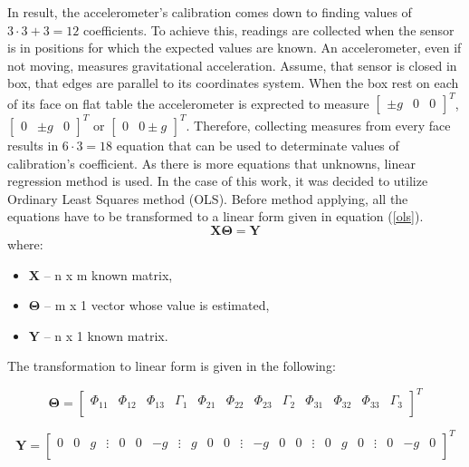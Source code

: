 In result, the accelerometer's calibration comes down to finding values of $3 \cdot 3 + 3 = 12$ coefficients. To achieve this, readings are collected when the sensor is in positions for which the expected values are known. An accelerometer, even if not moving, measures gravitational acceleration. Assume, that sensor is closed in box, that edges are parallel to its coordinates system. When the box rest on each of its face on flat table the accelerometer is exprected to measure $\begin{bmatrix}\pm g & 0 & 0\end{bmatrix}^T$, $\begin{bmatrix}0 & \pm g & 0\end{bmatrix}^T$ or $\begin{bmatrix} 0 & 0 \pm g\end{bmatrix}^T$. Therefore, collecting measures from every face results in $6 \cdot 3 = 18$ equation that can be used to determinate values of calibration's coefficient. As there is more equations that unknowns, linear regression method is used. In the case of this work, it was decided to utilize Ordinary Least Squares method (OLS). Before method applying, all the equations have to be transformed to a linear form given in equation (\ref{ols}).
\begin{equation}
	\bm{X} \bm{\Theta} = \bm{Y}
	\label{ols}
\end{equation}
where:
\begin{itemize}
	\item $\bm{X}$ -- n x m known matrix,
	\item $\bm{\Theta}$ -- m x 1 vector whose value is estimated,
	\item $\bm{Y}$ -- n x 1 known matrix.
\end{itemize}
 
The transformation to linear form is given in the following:
\setcounter{MaxMatrixCols}{25}

\begin{equation}
	\bm{\Theta} = \begin{bmatrix} \Phi_{11} & \Phi_{12} & \Phi_{13} & \Gamma_1 & \Phi_{21} & \Phi_{22} & \Phi_{23} & \Gamma_2 & \Phi_{31} & \Phi_{32} & \Phi_{33} & \Gamma_3 \\
	\end{bmatrix}^T
	\label{ols_theta}
\end{equation}


\begin{equation}
	\bm{Y} = \begin{bmatrix} 0 & 0 & g & \vdots & 0 & 0 & -g & \vdots & g & 0 & 0 & \vdots & -g & 0 & 0  & \vdots& 0 & g & 0 & \vdots & 0 & -g & 0 \\
	\end{bmatrix}^T
	\label{ols_y}
\end{equation}

